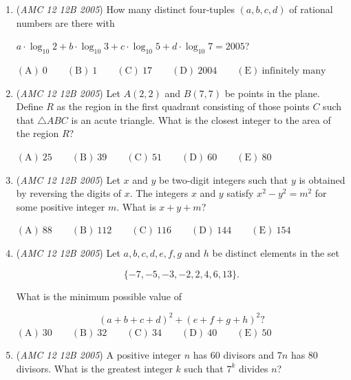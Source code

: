 \begin{enumerate}
 $\mathrm {(A)}\ \sqrt{2}  \qquad \mathrm {(B)}\ \sqrt{3}  \qquad \mathrm {(C)}\ 1+\sqrt{2}\qquad \mathrm {(D)}\ 1+\sqrt{3}\qquad \mathrm {(E)}\ 3$


	\item (\textit{AMC 12 12B 2005}) How many distinct four-tuples $(a, b, c, d)$ of rational numbers are there with


 $a \cdot \log_{10} 2+b \cdot \log_{10} 3 +c \cdot \log_{10} 5 + d \cdot \log_{10} 7 = 2005$?


 $\mathrm{(A)}\ 0      \qquad \mathrm{(B)}\ 1      \qquad \mathrm{(C)}\ 17     \qquad \mathrm{(D)}\ 2004   \qquad \mathrm{(E)}\ \text{infinitely many}$


	\item (\textit{AMC 12 12B 2005}) Let $A(2,2)$ and $B(7,7)$ be points in the plane. Define $R$ as the region in the first quadrant consisting of those points $C$ such that $\triangle ABC$ is an acute triangle. What is the closest integer to the area of the region $R$?


 $\mathrm{(A)}\ 25     \qquad \mathrm{(B)}\ 39     \qquad \mathrm{(C)}\ 51     \qquad \mathrm{(D)}\ 60     \qquad \mathrm{(E)}\ 80     \qquad$


	\item (\textit{AMC 12 12B 2005}) Let $x$ and $y$ be two-digit integers such that $y$ is obtained by reversing the digits of $x$. The integers $x$ and $y$ satisfy $x^{2}-y^{2}=m^{2}$ for some positive integer $m$. What is $x+y+m$?


 $\mathrm{(A)}\ 88    \qquad \mathrm{(B)}\ 112   \qquad \mathrm{(C)}\ 116   \qquad \mathrm{(D)}\ 144   \qquad \mathrm{(E)}\ 154   \qquad$


	\item (\textit{AMC 12 12B 2005}) Let $a,b,c,d,e,f,g$ and $h$ be distinct elements in the set


 
 \[\{-7,-5,-3,-2,2,4,6,13\}.\]


 What is the minimum possible value of


 
 \[(a+b+c+d)^{2}+(e+f+g+h)^{2}?\]
$\mathrm{(A)}\ 30     \qquad \mathrm{(B)}\ 32     \qquad \mathrm{(C)}\ 34     \qquad \mathrm{(D)}\ 40     \qquad \mathrm{(E)}\ 50$


	\item (\textit{AMC 12 12B 2005}) A positive integer $n$ has $60$ divisors and $7n$ has $80$ divisors.  What is the greatest integer $k$ such that $7^k$ divides $n$?



\end{enumerate}
